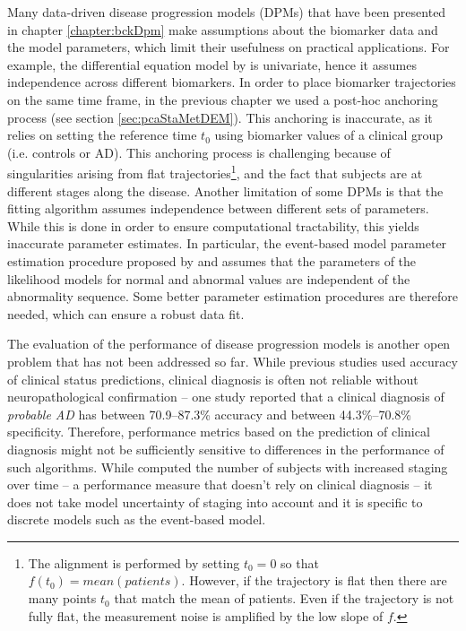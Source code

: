 Many data-driven disease progression models (DPMs) that have been presented in chapter \ref{chapter:bckDpm} make assumptions about the biomarker data and the model parameters, which limit their usefulness on practical applications. For example, the differential equation model by \cite{villemagne2013amyloid} is univariate, hence it assumes independence across different biomarkers. In order to place biomarker trajectories on the same time frame, in the previous chapter we used a post-hoc anchoring process (see section \ref{sec:pcaStaMetDEM}). This anchoring is inaccurate, as it relies on setting the reference time $t_0$ using biomarker values of a clinical group (i.e. controls or AD). This anchoring process is challenging because of singularities arising from flat trajectories\footnote{The alignment is performed by setting $t_0=0$ so that $f(t_0) = mean(patients)$. However, if the trajectory is flat then there are many points  $t_0$ that match the mean of patients. Even if the trajectory is not fully flat, the measurement noise is amplified by the low slope of $f$.}, and the fact that subjects are at different stages along the disease. Another limitation of some DPMs is that the fitting algorithm assumes independence between different sets of parameters. While this is done in order to ensure computational tractability, this yields inaccurate parameter estimates. In particular, the event-based model parameter estimation procedure proposed by \cite{fonteijn2012event} and \cite{young2014data} assumes that the parameters of the likelihood models for normal and abnormal values are independent of the abnormality sequence. Some better parameter estimation procedures are therefore needed, which can ensure a robust data fit.

The evaluation of the performance of disease progression models is another open problem that has not been addressed so far. While previous studies used accuracy of clinical status predictions\cite{young2014data}, clinical diagnosis is often not reliable without neuropathological confirmation -- one study reported that a clinical diagnosis of \emph{probable AD} has between 70.9--87.3\% accuracy and between 44.3\%--70.8\% specificity. Therefore, performance metrics based on the prediction of clinical diagnosis might not be sufficiently sensitive to differences in the performance of such algorithms. While \cite{fonteijn2012event} computed the number of subjects with increased staging over time -- a performance measure that doesn't rely on clinical diagnosis -- it does not take model uncertainty of staging into account and it is specific to discrete models such as the event-based model. 

